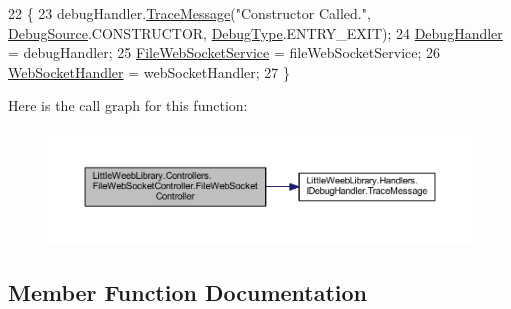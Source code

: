 \begin{DoxyCode}
22         \{
23             debugHandler.\mbox{\hyperlink{interface_little_weeb_library_1_1_handlers_1_1_i_debug_handler_a2e405bc3492e683cd3702fae125221bc}{TraceMessage}}(\textcolor{stringliteral}{"Constructor Called."}, 
      \mbox{\hyperlink{namespace_little_weeb_library_1_1_handlers_a2a6ca0775121c9c503d58aa254d292be}{DebugSource}}.CONSTRUCTOR, \mbox{\hyperlink{namespace_little_weeb_library_1_1_handlers_ab66019ed40462876ec4e61bb3ccb0a62}{DebugType}}.ENTRY\_EXIT);
24             \mbox{\hyperlink{class_little_weeb_library_1_1_handlers_1_1_debug_handler}{DebugHandler}} = debugHandler;
25             \mbox{\hyperlink{class_little_weeb_library_1_1_services_1_1_file_web_socket_service}{FileWebSocketService}} = fileWebSocketService;
26             \mbox{\hyperlink{class_little_weeb_library_1_1_handlers_1_1_web_socket_handler}{WebSocketHandler}} = webSocketHandler;
27         \}
\end{DoxyCode}
Here is the call graph for this function\+:\nopagebreak
\begin{figure}[H]
\begin{center}
\leavevmode
\includegraphics[width=350pt]{class_little_weeb_library_1_1_controllers_1_1_file_web_socket_controller_a6e297614bf4d98314e6d3583ccdf6dae_cgraph}
\end{center}
\end{figure}


\subsection{Member Function Documentation}
\mbox{\label{class_little_weeb_library_1_1_controllers_1_1_file_web_socket_controller_a9ecdec41f15ac23a56c402ff2c554a08}} 
